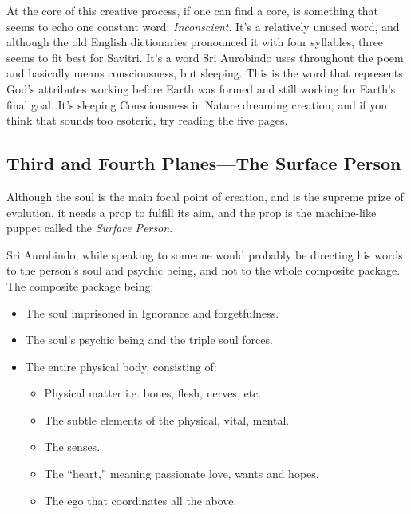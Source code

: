 \documentclass[12pt,a4paper]{book}
\begin{document}
At the core of this creative process, if one can find a core, is
something that seems to echo one constant word:
\emph{Inconscient}. It's a relatively unused word, and although the
old English dictionaries pronounced it with four syllables, three
seems to fit best for Savitri. It's a word Sri Aurobindo uses
throughout the poem and basically means consciousness, but
sleeping. This is the word that represents God's attributes working
before Earth was formed and still working for Earth's final goal. It's
sleeping Consciousness in Nature dreaming creation, and if you think
that sounds too esoteric, try reading the five pages.


\newpage
\begin{center}\section*{Third and Fourth Planes---The Surface Person}\end{center}

Although the soul is the main focal point of creation, and is the
supreme prize of evolution, it needs a prop to fulfill its aim, and
the prop is the machine-like puppet called the \emph{Surface Person}.

Sri Aurobindo, while speaking to someone would probably be directing
his words to the person's soul and psychic being, and not to the whole
composite package. The composite package being:

\begin{itemize}
\renewcommand{\labelitemi}{$\diamond$}
\item The soul imprisoned in Ignorance and forgetfulness.

\item The soul's psychic being and the triple soul forces.

\item The entire physical body, consisting of:

\begin{itemize}
  \item Physical matter i.e. bones, flesh, nerves, etc.

  \item The subtle elements of the physical, vital, mental.

  \item The senses.

  \item The ``heart,'' meaning passionate love, wants and hopes.

  \item The ego that coordinates all the above.
\end{itemize}
\end{itemize}
\end{document}
